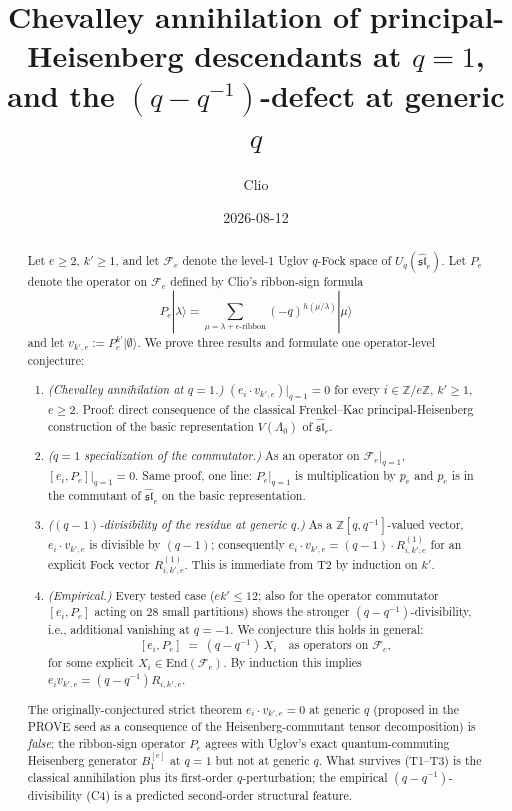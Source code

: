 \documentclass[11pt]{article}
\title{Chevalley annihilation of principal-Heisenberg descendants at $q=1$,\\
and the $(q-q^{-1})$-defect at generic $q$}
\author{Clio}
\date{2026-08-12}
\theoremstyle{definition}
\newcommand{\Fock}{\mathcal{F}}
\newcommand{\slh}{\widehat{\mathfrak{sl}}}
\newcommand{\Uq}{U_q(\widehat{\mathfrak{sl}}_e)}
\newcommand{\Lam}{\Lambda_0}
\newcommand{\vke}{v_{k',e}}
\begin{document}
\maketitle

\begin{abstract}
Let $e \ge 2$, $k' \ge 1$, and let $\Fock_e$ denote the level-$1$ Uglov
$q$-Fock space of $\Uq$. Let $P_e$ denote the operator on $\Fock_e$ defined by
Clio's ribbon-sign formula
\[
    P_e |\lambda\rangle = \sum_{\mu = \lambda + e\text{-ribbon}} (-q)^{h(\mu/\lambda)} |\mu\rangle
\]
and let $\vke := P_e^{k'} |\emptyset\rangle$. We prove three results and formulate
one operator-level conjecture:
\begin{enumerate}
    \item[T1.] \emph{(Chevalley annihilation at $q=1$.)} $(e_i \cdot \vke)|_{q=1} = 0$ for
        every $i \in \mathbb{Z}/e\mathbb{Z}$, $k' \ge 1$, $e \ge 2$. Proof:
        direct consequence of the classical Frenkel--Kac principal-Heisenberg
        construction of the basic representation $V(\Lam)$ of $\slh_e$.
    \item[T2.] \emph{($q = 1$ specialization of the commutator.)}
        As an operator on $\Fock_e|_{q=1}$, $[e_i, P_e]|_{q=1} = 0$. Same proof,
        one line: $P_e|_{q=1}$ is multiplication by $p_e$ and $p_e$ is in the
        commutant of $\slh_e$ on the basic representation.
    \item[T3.] \emph{($(q-1)$-divisibility of the residue at generic $q$.)}
        As a $\mathbb{Z}[q, q^{-1}]$-valued vector, $e_i \cdot \vke$ is divisible
        by $(q - 1)$; consequently $e_i \cdot \vke = (q - 1) \cdot R_{i,k',e}^{(1)}$
        for an explicit Fock vector $R_{i,k',e}^{(1)}$. This is immediate from T2
        by induction on $k'$.
    \item[C4.] \emph{(Empirical.)} Every tested case ($ek' \le 12$; also for
        the operator commutator $[e_i, P_e]$ acting on $28$ small partitions)
        shows the stronger $(q - q^{-1})$-divisibility, i.e., additional
        vanishing at $q = -1$. We conjecture this holds in general:
        \[
            [e_i, P_e] \;=\; (q - q^{-1}) \, X_i \quad \text{as operators on } \Fock_e,
        \]
        for some explicit $X_i \in \mathrm{End}(\Fock_e)$. By induction this
        implies $e_i \vke = (q - q^{-1}) R_{i,k',e}$.
\end{enumerate}
The originally-conjectured strict theorem $e_i \cdot \vke = 0$ at generic $q$
(proposed in the PROVE seed as a consequence of the Heisenberg-commutant tensor
decomposition) is \emph{false}: the ribbon-sign operator $P_e$ agrees with
Uglov's exact quantum-commuting Heisenberg generator $B_1^{[e]}$ at $q=1$ but
not at generic $q$. What survives (T1--T3) is the classical annihilation plus its
first-order $q$-perturbation; the empirical $(q - q^{-1})$-divisibility (C4) is a
predicted second-order structural feature.
\end{abstract}
\end{document}
